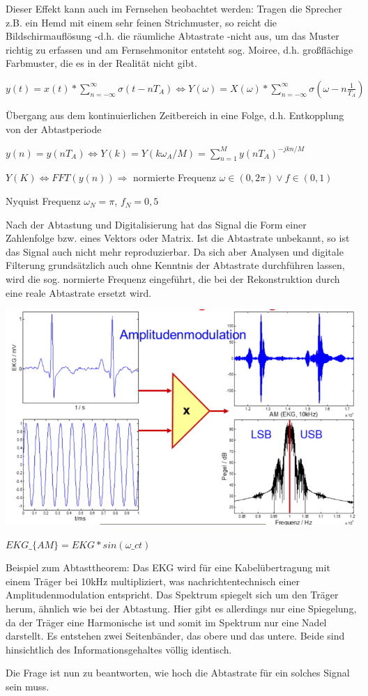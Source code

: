 \documentclass[a4paper]{article}
\begin{document}
\begin{multicols}{3}
  Dieser Effekt kann auch im Fernsehen beobachtet werden: Tragen die Sprecher z.B. ein Hemd mit einem sehr feinen Strichmuster, so reicht die Bildschirmauflösung -d.h. die räumliche Abtastrate -nicht aus, um das Muster richtig zu erfassen und am Fernsehmonitor entsteht sog. Moiree, d.h. großflächige Farbmuster, die es in der Realität nicht gibt.
  \begin{itemize*}
    \item $y(t)=x(t)*\sum^{\infty}_{n=-\infty} \sigma(t-nT_A) \Leftrightarrow Y(\omega)=X(\omega)*\sum^{\infty}_{n=-\infty}\sigma(\omega-n\frac{1}{T_A})$
    \item Übergang aus dem kontinuierlichen Zeitbereich in eine Folge, d.h. Entkopplung von der Abtastperiode
    \item $y(n)=y(nT_A) \Leftrightarrow Y(k)=Y(k\omega_A/M)=\sum_{n=1}^M y(nT_A)^{-jkn/M}$
    \item $Y(K)\Leftrightarrow FFT(y(n))\Rightarrow$ normierte Frequenz $\omega\in(0,2\pi)\vee f\in(0,1)$
    \item Nyquist Frequenz $\omega_N=\pi$, $f_N=0,5$
    \item Nach der Abtastung und Digitalisierung hat das Signal die Form einer Zahlenfolge bzw. eines Vektors oder Matrix. Ist die Abtastrate unbekannt, so ist das Signal auch nicht mehr reproduzierbar. Da sich aber Analysen und digitale Filterung grundsätzlich auch ohne Kenntnis der Abtastrate durchführen lassen, wird die sog. normierte Frequenz eingeführt, die bei der Rekonstruktion durch eine reale Abtastrate ersetzt wird.
  \end{itemize*}

  \includegraphics[width=.5\linewidth]{Assets/Biosignalverarbeitung-amplitudenmodulation.png}

  \begin{itemize*}
    \item $EKG\_\{AM\}=EKG*sin(\omega\_c t)$
    \item Beispiel zum Abtasttheorem: Das EKG wird für eine Kabelübertragung mit einem Träger bei 10kHz multipliziert, was nachrichtentechnisch einer Amplitudenmodulation entspricht. Das Spektrum spiegelt sich um den Träger herum, ähnlich wie bei der Abtastung. Hier gibt es allerdings nur eine Spiegelung, da der Träger eine Harmonische ist und somit im Spektrum nur eine Nadel darstellt. Es entstehen zwei Seitenbänder, das obere und das untere. Beide sind hinsichtlich des Informationsgehaltes völlig identisch.
    \item Die Frage ist nun zu beantworten, wie hoch die Abtastrate für ein solches Signal sein muss.
  \end{itemize*}


\end{multicols}
\end{document}
